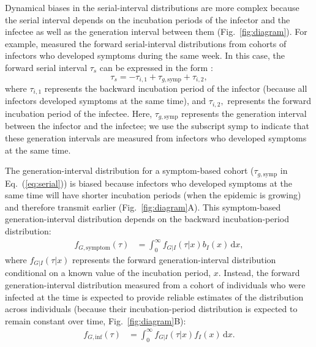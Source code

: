 \documentclass[12pt]{article}
\newcommand{\eref}[1]{Eq.~(\ref{eq:#1})}
\newcommand{\fref}[1]{Fig.~\ref{fig:#1}}
\newcommand{\dd}[1]{\ensuremath{\, \mathrm{d}#1}}
\newcommand{\dx}{\dd{x}}
\begin{document}
Dynamical biases in the serial-interval distributions are more complex because the serial interval depends on the incubation periods of the infector and the infectee as well as the generation interval between them (\fref{diagram}).
For example, \cite{backer2021omicron} measured the forward serial-interval distributions from cohorts of infectors who developed symptoms during the same week.
In this case, the forward serial interval $\tau_s$ can be expressed in the form \citep{park2021forward}:
\begin{equation}
\tau_s =  - \tau_{i, 1} + \tau_{g, \mathrm{symp}} + \tau_{i, 2},
\label{eq:serial}
\end{equation}
where $\tau_{i, 1}$ represents the backward incubation period of the infector (because all infectors developed symptoms at the same time), and $\tau_{i, 2},$ represents the forward incubation period of the infectee.
Here, $\tau_{g, \mathrm{symp}}$ represents the generation interval between the infector and the infectee; we use the subscript $\mathrm{symp}$ to indicate that these generation intervals are measured from infectors who developed symptoms at the same time.

The generation-interval distribution for a symptom-based cohort ($\tau_{g, \mathrm{symp}}$ in \eref{serial}) is biased because infectors who developed symptoms at the same time will have shorter incubation periods (when the epidemic is growing) and therefore transmit earlier (\fref{diagram}A).
This symptom-based generation-interval distribution depends on the backward incubation-period distribution:
\begin{align}
f_{G, \mathrm{symptom}}(\tau) &= \int_0^\infty f_{G|I}(\tau|x) b_I(x) \dx,
\end{align}
where $f_{G|I}(\tau|x)$ represents the forward generation-interval distribution conditional on a known value of the incubation period, $x$.
Instead, the forward generation-interval distribution measured from a cohort of individuals who were infected at the time is expected to provide reliable estimates of the distribution across individuals (because their incubation-period distribution is expected to remain constant over time, \fref{diagram}B):
\begin{align}
f_{G, \mathrm{inf}}(\tau) &= \int_0^\infty f_{G|I}(\tau|x) f_I(x) \dx.
\label{eq:meangen}
\end{align}
\end{document}

